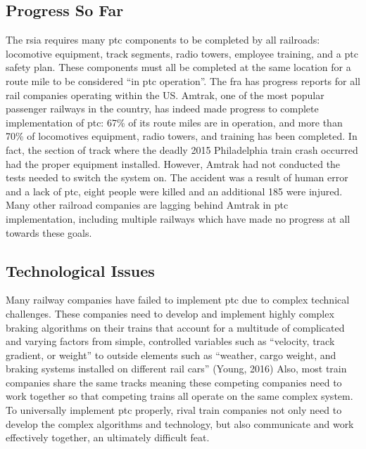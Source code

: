 \documentclass[11pt, titlepage]{article}
\begin{document}
\clearpage
\pagebreak

\subsection{Progress So Far}

The \gls{rsia} requires many \gls{ptc} components to be completed by all
railroads: locomotive equipment, track segments, radio towers, employee training,
and a \gls{ptc} safety plan. These components must all be completed at the same
location for a route mile to be considered ``in \gls{ptc} operation''. The
\gls{fra} has progress reports for all rail companies operating within the US.
Amtrak, one of the most popular passenger railways in the country, has indeed made
progress to complete implementation of \gls{ptc}: 67\% of its route miles are in
operation, and more than 70\% of locomotives equipment, radio towers, and training
has been completed. In fact, the section of track where the deadly 2015
Philadelphia train crash occurred had the proper equipment installed. However,
Amtrak had not conducted the tests needed to switch the system on. The accident
was a result of human error and a lack of \gls{ptc}, eight people were killed and
an additional 185 were injured. Many other railroad companies are lagging behind
Amtrak in \gls{ptc} implementation, including multiple railways which have made no
progress at all towards these goals.

\subsection{Technological Issues}

Many railway companies have failed to implement \gls{ptc} due to complex technical
challenges. These companies need to develop and implement highly complex braking
algorithms on their trains that account for a multitude of complicated and varying
factors from simple, controlled variables such as ``velocity, track gradient, or
weight'' to outside elements such as ``weather, cargo weight, and braking systems
installed on different rail cars'' (Young, 2016) Also, most train companies share
the same tracks meaning these competing companies need to work together so that
competing trains all operate on the same complex system. To universally implement
\gls{ptc} properly, rival train companies not only need to develop the complex
algorithms and technology, but also communicate and work effectively together, an
ultimately difficult feat.
\end{document}
